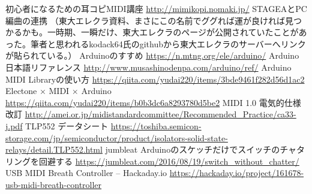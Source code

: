 \documentclass[uplatex, 10pt, dvipdfmx]{jsarticle}
\numberwithin{equation}{section}
\begin{document}
\begin{thebibliography}{99}
 初心者になるための耳コピMIDI講座 \url{http://mimikopi.nomaki.jp/}
 STAGEAとPC編曲の連携 （東大エレクラ資料、まさにこの名前でググれば運が良ければ見つかるかも。一時期、一瞬だけ、東大エレクラのページが公開されていたことがあった。筆者と思われるkodack64氏のgithubから東大エレクラのサーバーへリンクが貼られている。）
 Arduinoのすすめ \url{https://n.mtng.org/ele/arduino/}
 Arduino 日本語リファレンス \url{http://www.musashinodenpa.com/arduino/ref/}
 Arduino MIDI Libraryの使い方 \url{https://qiita.com/yudai220/items/3bde9461f282d56d1ac2}
 Electone $\times$ MIDI $\times$ Arduino \url{https://qiita.com/yudai220/items/b0b3dc6a8293780d5be2}
 MIDI 1.0 電気的仕様改訂 \url{http://amei.or.jp/midistandardcommittee/Recommended_Practice/ca33-j.pdf}
 TLP552 データシート \url{https://toshiba.semicon-storage.com/jp/semiconductor/product/isolators-solid-state-relays/detail.TLP552.html}
 jumbleat  Arduinoのスケッチだけでスイッチのチャタリングを回避する \url{https://jumbleat.com/2016/08/19/switch_without_chatter/}
 USB MIDI Breath Controller -- Hackaday.io \url{https://hackaday.io/project/161678-usb-midi-breath-controller}

\end{thebibliography}
\end{document}
